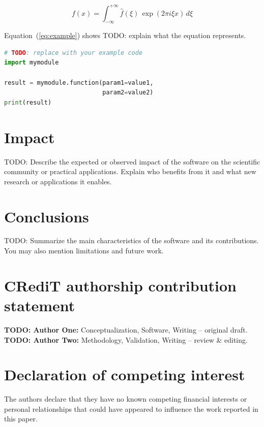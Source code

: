 \documentclass[preprint,12pt]{elsarticle}
\begin{document}
\begin{equation}
  \label{eq:example}
  f(x) = \int_{-\infty}^{+\infty} \hat{f}(\xi)\, \exp(2\pi i \xi x)\, d\xi
\end{equation}

Equation~(\ref{eq:example}) shows TODO: explain what the equation represents.

\begin{lstlisting}[language=Python,
caption={TODO: Description of the code snippet.},
label={lst:example}]
# TODO: replace with your example code
import mymodule

result = mymodule.function(param1=value1,
                           param2=value2)
print(result)
\end{lstlisting}

\section{Impact}
\label{sec:impact}

TODO: Describe the expected or observed impact of the software on the scientific
community or practical applications. Explain who benefits from it and what new
research or applications it enables.

\section{Conclusions}
\label{sec:conclusions}

TODO: Summarize the main characteristics of the software and its contributions.
You may also mention limitations and future work.

\section*{CRediT authorship contribution statement}

\textbf{TODO: Author One:} Conceptualization, Software, Writing -- original draft.\\
\textbf{TODO: Author Two:} Methodology, Validation, Writing -- review \& editing.

\section*{Declaration of competing interest}

The authors declare that they have no known competing financial interests or
personal relationships that could have appeared to influence the work reported
in this paper.
\end{document}
